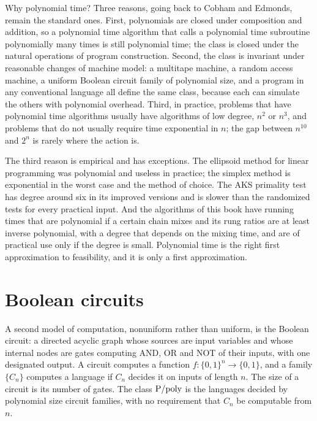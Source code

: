 Why polynomial time? Three reasons, going back to Cobham and Edmonds, remain the standard ones. First, polynomials are closed under composition and addition, so a polynomial time algorithm that calls a polynomial time subroutine polynomially many times is still polynomial time; the class is closed under the natural operations of program construction. Second, the class is invariant under reasonable changes of machine model: a multitape machine, a random access machine, a uniform Boolean circuit family of polynomial size, and a program in any conventional language all define the same class, because each can simulate the others with polynomial overhead. Third, in practice, problems that have polynomial time algorithms usually have algorithms of low degree, $n^2$ or $n^3$, and problems that do not usually require time exponential in $n$; the gap between $n^{10}$ and $2^n$ is rarely where the action is.

The third reason is empirical and has exceptions. The ellipsoid method for linear programming was polynomial and useless in practice; the simplex method is exponential in the worst case and the method of choice. The AKS primality test has degree around six in its improved versions and is slower than the randomized tests for every practical input. And the algorithms of this book have running times that are polynomial if a certain chain mixes and its rung ratios are at least inverse polynomial, with a degree that depends on the mixing time, and are of practical use only if the degree is small. Polynomial time is the right first approximation to feasibility, and it is only a first approximation.

\section{Boolean circuits}

A second model of computation, nonuniform rather than uniform, is the Boolean circuit: a directed acyclic graph whose sources are input variables and whose internal nodes are gates computing AND, OR and NOT of their inputs, with one designated output. A circuit computes a function $f : \{0,1\}^n \to \{0,1\}$, and a family $\{C_n\}$ computes a language if $C_n$ decides it on inputs of length $n$. The size of a circuit is its number of gates. The class $\mathrm{P}/\mathrm{poly}$ is the languages decided by polynomial size circuit families, with no requirement that $C_n$ be computable from $n$.

